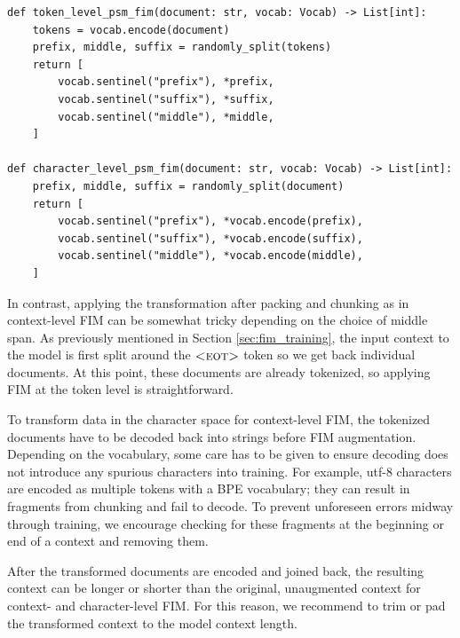 \documentclass[postscript]{article}
\begin{document}
\vspace{-6pt}
\begin{center}
\begin{minipage}{5in}
\begin{lstlisting}[style=python]
def token_level_psm_fim(document: str, vocab: Vocab) -> List[int]:
    tokens = vocab.encode(document)
    prefix, middle, suffix = randomly_split(tokens)
    return [
        vocab.sentinel("prefix"), *prefix,
        vocab.sentinel("suffix"), *suffix,
        vocab.sentinel("middle"), *middle,
    ]

def character_level_psm_fim(document: str, vocab: Vocab) -> List[int]:
    prefix, middle, suffix = randomly_split(document)
    return [
        vocab.sentinel("prefix"), *vocab.encode(prefix),
        vocab.sentinel("suffix"), *vocab.encode(suffix),
        vocab.sentinel("middle"), *vocab.encode(middle),
    ]
\end{lstlisting}
\end{minipage}
\end{center}
\vspace{-3pt}

In contrast, applying the transformation after packing and chunking as in context-level FIM can be somewhat tricky depending on the choice of middle span. As previously mentioned in Section \ref{sec:fim_training}, the input context to the model is first split around the $\textsc{<eot>}$ token so we get back individual documents. At this point, these documents are already tokenized, so applying FIM at the token level is straightforward.

To transform data in the character space for context-level FIM, the tokenized documents have to be decoded back into strings before FIM augmentation. Depending on the vocabulary, some care has to be given to ensure decoding does not introduce any spurious characters into training. For example, utf-8 characters are encoded as multiple tokens with a BPE vocabulary; they can result in fragments from chunking and fail to decode. To prevent unforeseen errors midway through training, we encourage checking for these fragments at the beginning or end of a context and removing them.

After the transformed documents are encoded and joined back, the resulting context can be longer or shorter than the original, unaugmented context for context- and character-level FIM. For this reason, we recommend to trim or pad the transformed context to the model context length.
\end{document}
